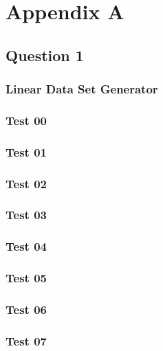 \newpage
\renewcommand{\thesubsection}{\thesection.\arabic{subsection}}
\section{Appendix A}
	\subsection{Question 1}
		\subsubsection{Linear Data Set Generator}
		
		\pagebreak
		\subsubsection{Test 00}
		
		\pagebreak
		\subsubsection{Test 01}
		
		\pagebreak
		\subsubsection{Test 02}
		
		\pagebreak
		\subsubsection{Test 03}
		
		\pagebreak
		\subsubsection{Test 04}
		
		\pagebreak
		\subsubsection{Test 05}
		
		\pagebreak
		\subsubsection{Test 06}
		
		\pagebreak
		\subsubsection{Test 07}
		
		\pagebreak
